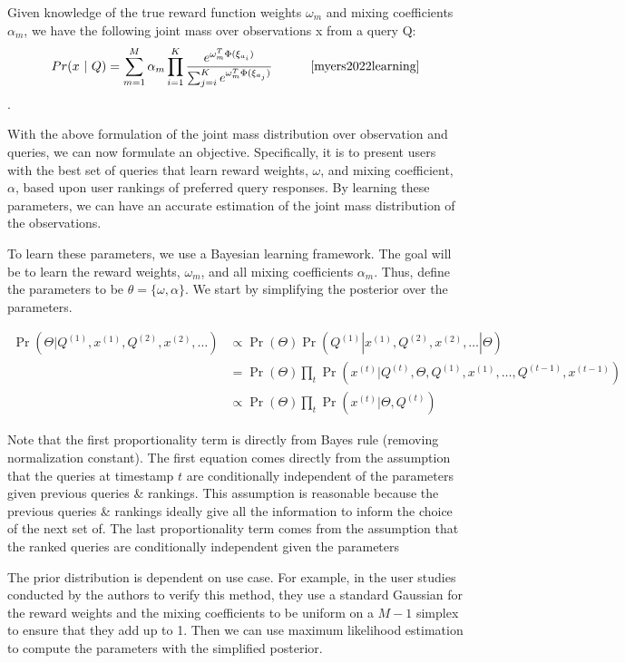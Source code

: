 \documentclass[
  letterpaper,
  DIV=11,
  numbers=noendperiod,
  oneside]{scrreprt}
\theoremstyle{remark}
\begin{document}
Given knowledge of the true reward function weights \(\omega_m\) and
mixing coefficients \(\alpha_m\), we have the following joint mass over
observations x from a query Q:
\[Pr(x\ |\ Q) = \sum_{m = 1}^M \alpha_m\prod_{i = 1}^K\frac{e^{\omega_m^T \Phi(\xi_{a_i})}}{\sum_{j = i}^K e^{\omega_m^T \Phi(\xi_{a_j})}} \ \ \ \ \ \ \ \ \ \cite{myers2022learning}\].

With the above formulation of the joint mass distribution over
observation and queries, we can now formulate an objective.
Specifically, it is to present users with the best set of queries that
learn reward weights, \(\omega\), and mixing coefficient, \(\alpha\),
based upon user rankings of preferred query responses. By learning these
parameters, we can have an accurate estimation of the joint mass
distribution of the observations.

To learn these parameters, we use a Bayesian learning framework. The
goal will be to learn the reward weights, \(\omega_m\), and all mixing
coefficients \(\alpha_m\). Thus, define the parameters to be
\(\theta = \{\omega, \alpha\}\). We start by simplifying the posterior
over the parameters.

\[\begin{aligned}
\Pr(\Theta | Q^{(1)}, x^{(1)}, Q^{(2)}, x^{(2)}, \ldots) & \propto \Pr(\Theta) \Pr(Q^{(1)} | x^{(1)}, Q^{(2)}, x^{(2)}, \ldots | \Theta) \\
& = \Pr(\Theta) \prod_t \Pr(x^{(t)} | Q^{(t)}, \Theta, Q^{(1)}, x^{(1)}, \ldots, Q^{(t-1)}, x^{(t-1)}) \\
& \propto \Pr(\Theta) \prod_t \Pr(x^{(t)} | \Theta, Q^{(t)})
\end{aligned}\]

Note that the first proportionality term is directly from Bayes rule
(removing normalization constant). The first equation comes directly
from the assumption that the queries at timestamp \(t\) are
conditionally independent of the parameters given previous queries \&
rankings. This assumption is reasonable because the previous queries \&
rankings ideally give all the information to inform the choice of the
next set of. The last proportionality term comes from the assumption
that the ranked queries are conditionally independent given the
parameters

The prior distribution is dependent on use case. For example, in the
user studies conducted by the authors to verify this method, they use a
standard Gaussian for the reward weights and the mixing coefficients to
be uniform on a \(M - 1\) simplex to ensure that they add up to 1. Then
we can use maximum likelihood estimation to compute the parameters with
the simplified posterior.
\end{document}

